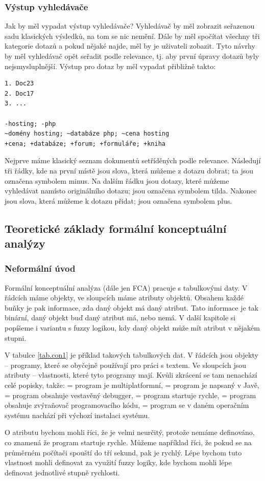 \documentclass[12pt]{article}
\newcommand{\ssection}[1]{\subsection{#1}}
\newcommand{\sssection}[1]{\subsubsection{#1}}
\begin{document}
\sssection{Výstup vyhledávače}

Jak by měl vypadat výstup vyhledávače? Vyhledávač by měl zobrazit seřazenou sadu klasických výsledků, na tom se nic nemění. Dále by měl spočítat všechny tři kategorie dotazů a pokud nějaké najde, měl by je uživateli zobazit. Tyto návrhy by měl vyhledávač opět seřadit podle relevance, tj. aby první úpravy dotazů byly nejsmysluplnější. Výstup pro dotaz  by měl vypadat přibližně takto:

\begin{verbatim}
1. Doc23
2. Doc17
3. ... 

-hosting; -php
~domény hosting; ~databáze php; ~cena hosting
+cena; +databáze; +forum; +formuláře; +kniha
\end{verbatim}

Nejprve máme klasický seznam dokumentů setříděných podle relevance. Následují tři řádky, kde na první místě jsou slova, která můžeme z dotazu dobrat; ta jsou označena symbolem minus. Na dalším řádku jsou dotazy, které můžeme vyhledávat namísto originálního dotazu; jsou označena symbolem tilda. Nakonec jsou slova, která můžeme k dotazu přidat; jsou označena symbolem plus.

\ssection{Teoretické základy formální konceptuální analýzy}
\sssection{Neformální úvod}
Formální konceptuální analýza (dále jen FCA) pracuje s tabulkovými daty. V řádcích máme objekty, ve sloupcích máme atributy objektů. Obsahem každé buňky je pak informace, zda daný objekt má daný atribut. Tato informace je tak binární, daný objekt buď daný atribut má, nebo nemá. V další kapitole si popíšeme i variantu s fuzzy logikou, kdy daný objekt může mít atribut v nějakém stupni. 

V tabulce \ref{tab.con1} je příklad takových tabulkových dat. V řádcích jsou objekty -- programy, které se obyčejně používají pro práci s textem. Ve sloupcích jsou atributy -- vlastnosti, které tyto programy mají. Kvůli zkrácení se tam nenachází celé popisky, takže:  = program je multiplatformní,  = program je napsaný v Javě,  = program obsahuje vestavěný debugger,  = program startuje rychle,  = program obsahuje zvýraňovač programovacího kódu,  = program se v daném operačním systému nachází při výchozí instalaci systému. 

O atributu  bychom mohli říci, že je velmi neurčitý, protože nemáme definováno, co znamená že program startuje rychle. Můžeme například říci, že pokud se na průměrném počítači spouští do tří sekund, pak je rychlý. Lépe bychom tuto vlastnost mohli definovat za využití fuzzy logiky, kde bychom mohli lépe definovat jednotlivé stupně rychlosti. 
\end{document}
